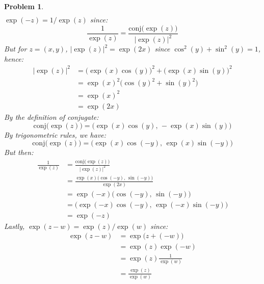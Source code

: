 \documentclass{article}
\theoremstyle{plain}
\theoremstyle{normal}
\newtheorem{problem}{Problem}[section]
\begin{document}
\begin{problem}
\begin{align}
            \end{align}
            $\exp(-z)=1/\exp(z)$ since:
            \begin{equation}
                \frac{1}{\exp(z)}=
                    \frac{\textrm{conj}\big(\exp(z)\big)}{|\exp(z)|^{2}}
            \end{equation}
            But for $z=(x,y)$, $|\exp(z)|^{2}=\exp(2x)$ since
            $\cos^{2}(y)+\sin^{2}(y)=1$, hence:
            \begin{align}
                |\exp(z)|^{2}&=
                    \Big(\exp(x)\cos(y)\Big)^{2}+\Big(\exp(x)\sin(y)\Big)^{2}\\
                    &=\exp(x)^{2}\Big(\cos(y)^{2}+\sin(y)^{2}\Big)\\
                    &=\exp(x)^{2}\\
                    &=\exp(2x)
            \end{align}
            By the definition of conjugate:
            \begin{equation}
                \textrm{conj}\big(\exp(z)\big)
                =\Big(\exp(x)\cos(y),\,-\exp(x)\sin(y)\Big)
            \end{equation}
            By trigonometric rules, we have:
            \begin{equation}
                \textrm{conj}\big(\exp(z)\big)
                =\Big(\exp(x)\cos(-y),\,\exp(x)\sin(-y)\Big)
            \end{equation}
            But then:
            \begin{align}
                \frac{1}{\exp(z)}&=
                \frac{\textrm{conj}\big(\exp(z)\big)}{|\exp(z)|^{2}}\\
                &=\frac{\exp(x)\Big(\cos(-y),\,\sin(-y)\Big)}{\exp(2x)}\\
                &=\exp(-x)\Big(\cos(-y),\,\sin(-y)\Big)\\
                &=\Big(\exp(-x)\cos(-y),\,\exp(-x)\sin(-y)\Big)\\
                &=\exp(-z)
            \end{align}
            Lastly, $\exp(z-w)=\exp(z)/\exp(w)$ since:
            \begin{align}
                \exp(z-w)&=\exp\big(z+(-w)\big)\\
                    &=\exp(z)\exp(-w)\\
                    &=\exp(z)\frac{1}{\exp(w)}\\
                    &=\frac{\exp(z)}{\exp(w)}
            \end{align}
        \end{problem}
\end{document}
